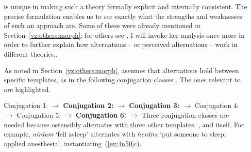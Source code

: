\begin{exe}
\begin{xlist}
\begin{xlist}
\begin{exe}
\begin{exe}
\begin{xlist}
\begin{exe}
\begin{xlist}
\begin{exe}
\begin{xlist}
\begin{xlist}
\begin{exe}
\begin{xlist}
\begin{exe}
\begin{xlist}
\begin{exe}
\begin{xlist}
\begin{exe}
\begin{exe}
\begin{exe}
\begin{xlist}
\begin{exe}
\begin{exe}
\begin{xlist}
\begin{xlist}
\begin{exe}
\begin{xlist}
\begin{exe}
\begin{exe}
\begin{xlist}
\begin{exe}
\begin{exe}
\begin{xlist}
\begin{exe}
\begin{xlist}
\begin{exe}
\begin{xlist}
\begin{exe}
\begin{xlist}
\begin{exe}
\begin{exe}
\begin{xlist}
\begin{exe}
\begin{exe}
\begin{xlist}
\begin{xlist}
\begin{exe}
\begin{xlist}
\begin{xlist}
\begin{exe}
\begin{xlist}
\begin{exe}
\begin{xlist}
\begin{exe}
\begin{xlist}
\begin{exe}
\begin{xlist}
\begin{exe}
\begin{exe}
\begin{exe}
\begin{exe}
\begin{xlist}
\begin{exe}
\begin{exe}
\begin{xlist}
\begin{xlist}
\begin{exe}
\cite{arad05} is unique in making such a theory formally explicit and internally consistent. The precise formulation enables us to see exactly what the strengths and weaknesses of such an approach are. Some of these were already mentioned in Section~\ref{vz:others:morph}; for others see \cite{kastnertucker19cup}. I will invoke her analysis once more in order to further explain how alternations -- or perceived alternations -- work in different theories..

As noted in Section~\ref{vz:others:morph}, \cite{arad05} assumes that alternations hold between specific templates, as in the following conjugation classes \citep[226]{arad05}. The ones relevant to {\thif} are highlighted.
 \begin{exe}
 \ex  \label{ex:4n50}
 \begin{xlist} 
 	\ex  Conjugation 1: {\tnif} $\rightarrow$ {\tkal} 
 	\ex  \textbf{Conjugation 2: {\tkal} $\rightarrow$ {\thif}} 
 	\ex  \textbf{Conjugation 3: {\tnif} $\rightarrow$ {\thif}} 
 	\ex  Conjugation 4: {\thit} $\rightarrow$ {\tpie} 
 	\ex  Conjugation 5: {\thit} $\rightarrow$ {\tpie} 
 	\ex  \textbf{Conjugation 6: {\thif} $\rightarrow$ {\thif}} 
 \z
\z 
Three conjugation classes are needed because {\thif} ostensibly alternates with three other templates: {\tkal}, {\tnif} and {\thif} itself. For example, \emph{nirdam} `fell asleep' alternates with \emph{herdim} `put someone to sleep; applied anesthesia', instantiating~(\ref{ex:4n50}c).


\end{xlist}
\end{exe}
\end{exe}
\end{xlist}
\end{xlist}
\end{exe}
\end{exe}
\end{xlist}
\end{exe}
\end{exe}
\end{exe}
\end{exe}
\end{xlist}
\end{exe}
\end{xlist}
\end{exe}
\end{xlist}
\end{exe}
\end{xlist}
\end{exe}
\end{xlist}
\end{xlist}
\end{exe}
\end{xlist}
\end{xlist}
\end{exe}
\end{exe}
\end{xlist}
\end{exe}
\end{exe}
\end{xlist}
\end{exe}
\end{xlist}
\end{exe}
\end{xlist}
\end{exe}
\end{xlist}
\end{exe}
\end{exe}
\end{xlist}
\end{exe}
\end{exe}
\end{xlist}
\end{exe}
\end{xlist}
\end{xlist}
\end{exe}
\end{exe}
\end{xlist}
\end{exe}
\end{exe}
\end{exe}
\end{xlist}
\end{exe}
\end{xlist}
\end{exe}
\end{xlist}
\end{exe}
\end{xlist}
\end{xlist}
\end{exe}
\end{xlist}
\end{exe}
\end{xlist}
\end{exe}
\end{exe}
\end{xlist}
\end{xlist}
\end{exe}
